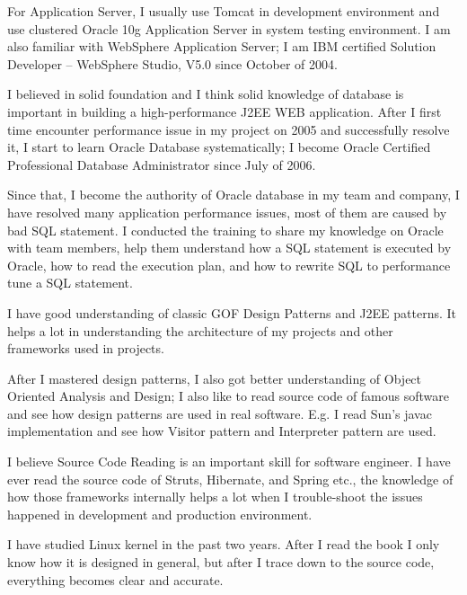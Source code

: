 For Application Server, I usually use Tomcat in development environment and
use clustered Oracle 10g Application Server in system testing environment. 
I am also familiar with WebSphere Application Server; 
I am IBM certified Solution Developer -- WebSphere Studio, V5.0 since October of 2004.

\par
I believed in solid foundation and I think solid knowledge of database is
 important in building a high-performance J2EE WEB application. 
After I first time encounter performance issue in my project on 2005 and 
successfully resolve it, I start to learn Oracle Database systematically; 
I become Oracle Certified Professional Database Administrator since July of 2006. 

Since that, I become the authority of Oracle database in my team and company, 
I have resolved many application performance issues, most of them are caused 
by bad SQL statement. I conducted the training to share my knowledge on Oracle
with team members, help them understand how a SQL statement is executed by Oracle,
how to read the execution plan, and how to rewrite SQL to performance tune a SQL statement.


I have good understanding of classic GOF Design Patterns and J2EE patterns. 
It helps a lot in understanding the architecture of my projects and other 
frameworks used in projects. 

After I mastered design patterns, I also got better understanding of Object Oriented
 Analysis and Design;  
I also like to read source code of famous software and see how design patterns are
used in real software. E.g. I read Sun's javac implementation and see how Visitor
pattern and Interpreter pattern are used. %

    
\par
I believe Source Code Reading is an important skill for software engineer.
I have ever read the source code of Struts, Hibernate, and Spring etc., 
the knowledge of how those frameworks internally helps a lot when I trouble-shoot 
the issues happened in development and production environment. 

I have studied Linux kernel in the past two years. After I read the book I only know how 
it is designed in general, but after I trace down to the source code, everything becomes
clear and accurate. 

